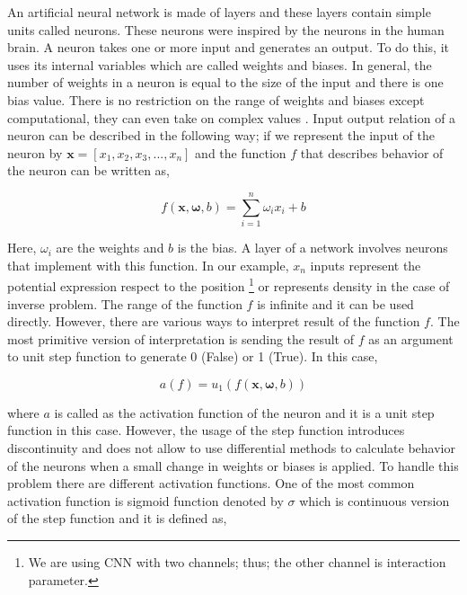 \documentclass[a4paper,times,hidelinks,12pt]{article}
\begin{document}
An artificial neural network is made of layers and these layers contain simple units called neurons. These neurons were inspired by the neurons in the human brain. A neuron takes one or more input and generates an output. To do this, it uses its internal variables which are called weights and biases. In general, the number of weights in a neuron is equal to the size of the input and there is one bias value. There is no restriction on the range of weights and biases except computational, they can even take on complex values \cite{zimmermann2011comparison}. Input output relation of a neuron can be described in the following way; if we represent the input of the neuron by $\boldsymbol{x} = [x_1, x_2, x_3, ..., x_n]$ and the function $f$ that describes behavior of the neuron can be written as, 

\begin{equation}
\label{eq:NU_neuron}
f(\boldsymbol{x}, \boldsymbol{\omega}, b) = \sum\limits_{i = 1}^n \omega_i x_i + b
\end{equation}

\noindent Here, $\omega_i$ are the weights and $b$ is the bias. A layer of a network involves neurons that implement with this function. In our example, $x_n$ inputs represent the potential expression respect to the position \footnote{We are using CNN with two channels; thus; the other channel is interaction parameter.} or represents density in the case of inverse problem. The range of the function $f$ is infinite and it can be used directly. However, there are various ways to interpret result of the function $f$. The most primitive version of interpretation is sending the result of $f$ as an argument to unit step function to generate 0 (False) or 1 (True). In this case, 

\begin{equation}
\label{eq:NU_step_function}
a(f) = u_1(f(\boldsymbol{x}, \boldsymbol{\omega}, b))
\end{equation}

\noindent where $a$ is called as the activation function of the neuron and it is a unit step function in this case. However, the usage of the step function introduces discontinuity and does not allow to use differential methods to calculate behavior of the neurons when a small change in weights or biases is applied. To handle this problem there are different activation functions. 
One of the most common activation function is sigmoid function denoted by $\sigma$ which is continuous version of the step function and it is defined as,
\end{document}
